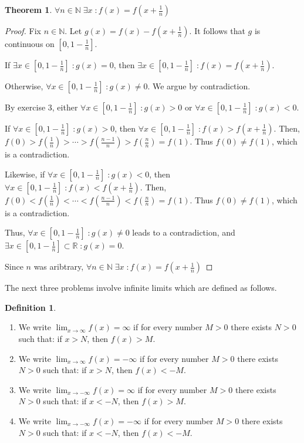 \documentclass{article} %
\theoremstyle{plain}
\newtheorem*{theorem*}{Theorem}
\theoremstyle{definition}
\newtheorem*{definition*}{Definition}
\begin{document}
\begin{theorem*} $\forall n \in \mathbb{N} \; \exists x \; \colon f(x) = f(x + \frac{1}{n})$

\end{theorem*}

\begin{proof} 
    Fix $n \in \mathbb{N}$. Let $g(x) = f(x) - f(x + \frac{1}{n})$. It follows that $g$ is continuous on $[0, 1 - \frac{1}{n}]$.

    If $\exists x \in [0,1 - \frac{1}{n}] \; \colon g(x) = 0$, then $\exists x \in [0,1 - \frac{1}{n}] \; \colon f(x) = f(x + \frac{1}{n})$.
    
    Otherwise, $\forall x \in [0,1 - \frac{1}{n}] \; \colon g(x) \neq 0$. We argue by contradiction.

    By exercise 3, either $\forall x \in [0,1 - \frac{1}{n}] \; \colon g(x) > 0$ or $\forall x \in [0,1 - \frac{1}{n}] \; \colon g(x) < 0$.

    If $\forall x \in [0,1 - \frac{1}{n}] \; \colon g(x) > 0$, then $\forall x \in [0,1 - \frac{1}{n}] \; \colon f(x) > f(x + \frac{1}{n})$. Then, $f(0) > f(\frac{1}{n}) > \cdots > f(\frac{n-1}{n}) > f(\frac{n}{n}) = f(1)$. Thus $f(0) \neq f(1)$, which is a contradiction.

    Likewise, if $\forall x \in [0,1 - \frac{1}{n}] \; \colon g(x) < 0$, then $\forall x \in [0,1 - \frac{1}{n}] \; \colon f(x) < f(x + \frac{1}{n})$. Then, $f(0) < f(\frac{1}{n}) < \cdots < f(\frac{n-1}{n}) < f(\frac{n}{n}) = f(1)$. Thus $f(0) \neq f(1)$, which is a contradiction.

    Thus, $\forall x \in [0,1 - \frac{1}{n}] \; \colon g(x) \neq 0$ leads to a contradiction, and $\exists x \in [0,1 - \frac{1}{n}] \subset \mathbb{R} \; \colon g(x) = 0$.
    
    Since $n$ was aribtrary, $\forall n \in \mathbb{N} \; \exists x \; \colon f(x) = f(x + \frac{1}{n})$

\end{proof} 


The next three problems involve infinite limits which are defined as follows. 

\begin{definition*} \
\begin{enumerate}
\item We write $\lim_{x \rightarrow \infty} f(x) = \infty$ if for every number $M > 0$ there exists $N> 0$ such that: if $x >N$, then $f(x) > M$. 
\item We write $\lim_{x \rightarrow \infty} f(x) = -\infty$ if for every number $M > 0$ there exists $N> 0$ such that: if $x >N$, then $f(x) < -M$. 
\item We write $\lim_{x \rightarrow -\infty} f(x) = \infty$ if for every number $M > 0$ there exists $N> 0$ such that: if $x <-N$, then $f(x) > M$. 
\item  We write $\lim_{x \rightarrow -\infty} f(x) = -\infty$ if for every number $M > 0$ there exists $N> 0$ such that: if $x <-N$, then $f(x) <- M$. 
\end{enumerate}

\end{definition*}
\end{document}
